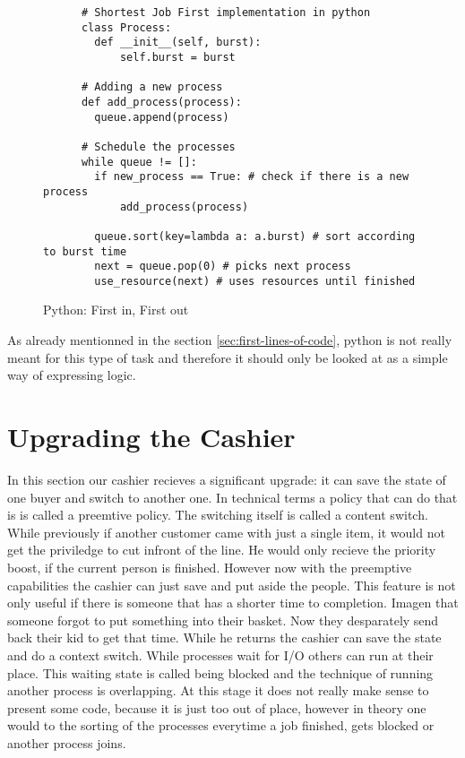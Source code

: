 \begin{figure}[h]
    \begin{verbatim}
      # Shortest Job First implementation in python
      class Process:
        def __init__(self, burst):
            self.burst = burst

      # Adding a new process
      def add_process(process):
        queue.append(process)

      # Schedule the processes
      while queue != []:
        if new_process == True: # check if there is a new process
            add_process(process)
        
        queue.sort(key=lambda a: a.burst) # sort according to burst time
        next = queue.pop(0) # picks next process
        use_resource(next) # uses resources until finished
    \end{verbatim}
    \label{code:sjf}
    \caption{Python: First in, First out}
\end{figure}

As already mentionned in the section \ref{sec:first-lines-of-code}, python is not really meant for this type of task and therefore it should only be looked at as a simple way of expressing logic.

\section{Upgrading the Cashier}

In this section our cashier recieves a significant upgrade: it can save the state of one buyer and switch to another one.
In technical terms a policy that can do that is is called a preemtive policy. 
The switching itself is called a content switch.
While previously if another customer came with just a single item, it would not get the priviledge to cut infront of the line. 
He would only recieve the priority boost, if the current person is finished.
However now with the preemptive capabilities the cashier can just save and put aside the people.
This feature is not only useful if there is someone that has a shorter time to completion.
Imagen that someone forgot to put something into their basket.
Now they desparately send back their kid to get that time. While he returns the cashier can save the state and do a context switch.
While processes wait for I/O others can run at their place.
This waiting state is called being blocked and the technique of running another process is overlapping.
At this stage it does not really make sense to present some code, because it is just too out of place, however in theory one would to the sorting of the processes everytime a job finished, gets blocked or another process joins.

